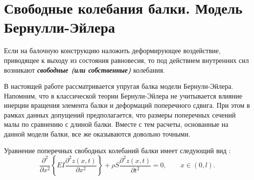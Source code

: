 \section{Свободные колебания балки. Модель Бернулли\nobreak-Эйлера}
\label{section:GoverningProblem}
%
%
%
\par
Если на балочную конструкцию наложить деформирующее воздействие,
приводящее к выходу из состояния равновесия,
то под действием внутренних сил возникают \textbf{\emph{свободные (или собственные)}} колебания.
%
%
%
\par
В настоящей работе
рассматривается упругая балка модели Бернули-Эйлера.
%
%
%
Напомним, что в классической теории Бернули-Эйлера не учитывается влияние инерции вращения элемента балки и деформаций поперечного сдвига.
%
%
%
При этом в рамках данных допущений предполагается, что размеры поперечных сечений малы по сравнению с длиной балки.
%
%
%
Вместе с тем расчеты, основанные на данной модели балки, все же оказываются довольно точными.
%
%
%
\par
Уравнение поперечных свободных колебаний балки имеет следующий вид
\cite{book:Timoshenko}:
\begin{equation}
\label{BeamVibrating:Dynamic}
\frac{\partial^2}{\partial x^2} \left\{EI\frac{\partial^2 z(x,t)}{\partial x^2} \right\}
+
\rho S \frac{\partial^2 z(x,t)}{\partial t^2}
=
0,
\qquad
x \in (0,l). 
\end{equation}

